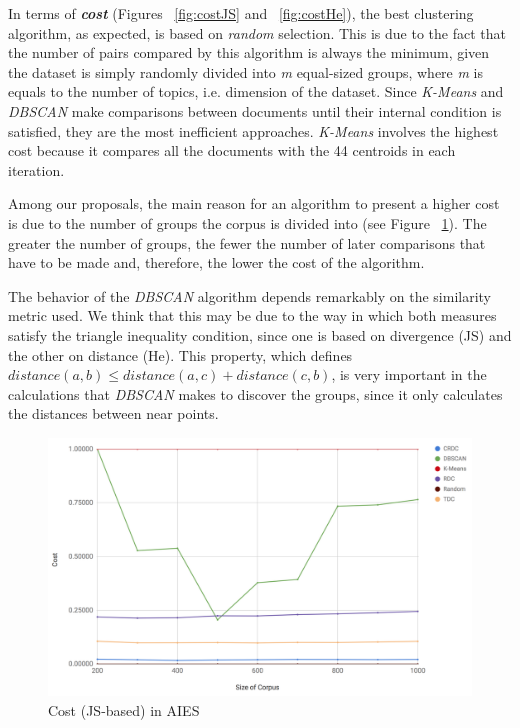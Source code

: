 In terms of \textbf{\textit{cost}} (Figures ~\ref{fig:costJS} and ~\ref{fig:costHe}), the best clustering algorithm, as expected, is based on \textit{random} selection. This is due to the fact that the number of pairs compared by this algorithm is always the minimum, given the dataset is simply randomly divided into \textit{m} equal-sized groups, where \textit{m} is equals to the number of topics, i.e. dimension of the dataset. Since \textit{K-Means} and \textit{DBSCAN} make comparisons between documents until their internal condition is satisfied, they are the most inefficient approaches. \textit{K-Means} involves the highest cost because it compares all the documents with the 44 centroids in each iteration.

Among our proposals, the main reason for an algorithm to present a higher cost is due to the number of groups the corpus is divided into (see Figure ~\ref{fig:clusters}). The greater the number of groups, the fewer the number of later comparisons that have to be made and, therefore, the lower the cost of the algorithm.

The behavior of the \textit{DBSCAN} algorithm depends remarkably on the similarity metric used. We think that this may be due to the way in which both measures satisfy the triangle inequality condition, since one is based on divergence (JS) and the other on distance (He). This property, which defines $distance(a,b) \leq distance(a,c) + distance(c,b)$, is very important in the calculations that \textit{DBSCAN} makes to discover the groups, since it only calculates the distances between near points.

\begin{figure}[!htb]\centering
  \center
  \includegraphics[scale=0.45]{costJS.png}
  \caption{Cost (JS-based) in AIES}
  \label{fig:clusters}
\end{figure}

